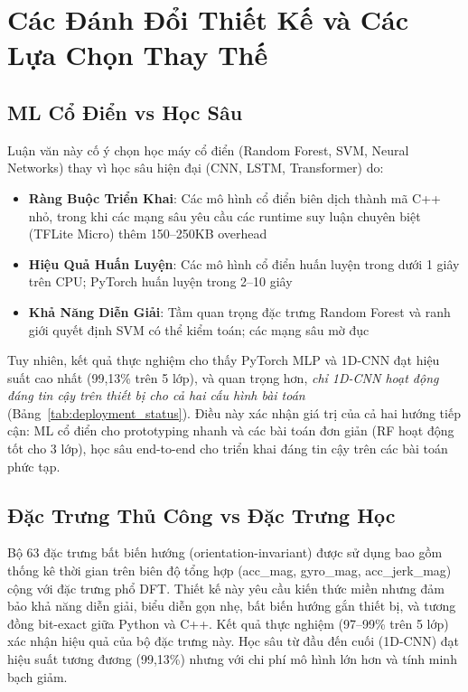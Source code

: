 \section{Các Đánh Đổi Thiết Kế và Các Lựa Chọn Thay Thế}

\subsection{ML Cổ Điển vs Học Sâu}
Luận văn này cố ý chọn học máy cổ điển (Random Forest, SVM, Neural Networks) thay vì học sâu hiện đại (CNN, LSTM, Transformer) do:
\begin{itemize}
    \item \textbf{Ràng Buộc Triển Khai}: Các mô hình cổ điển biên dịch thành mã C++ nhỏ, trong khi các mạng sâu yêu cầu các runtime suy luận chuyên biệt (TFLite Micro) thêm 150--250KB overhead
    \item \textbf{Hiệu Quả Huấn Luyện}: Các mô hình cổ điển huấn luyện trong dưới 1 giây trên CPU; PyTorch huấn luyện trong 2--10 giây
    \item \textbf{Khả Năng Diễn Giải}: Tầm quan trọng đặc trưng Random Forest và ranh giới quyết định SVM có thể kiểm toán; các mạng sâu mờ đục
\end{itemize}

Tuy nhiên, kết quả thực nghiệm cho thấy PyTorch MLP và 1D-CNN đạt hiệu suất cao nhất (99,13\% trên 5 lớp), và quan trọng hơn, \textit{chỉ 1D-CNN hoạt động đáng tin cậy trên thiết bị cho cả hai cấu hình bài toán} (Bảng~\ref{tab:deployment_status}). Điều này xác nhận giá trị của cả hai hướng tiếp cận: ML cổ điển cho prototyping nhanh và các bài toán đơn giản (RF hoạt động tốt cho 3 lớp), học sâu end-to-end cho triển khai đáng tin cậy trên các bài toán phức tạp.

\subsection{Đặc Trưng Thủ Công vs Đặc Trưng Học}
Bộ 63 đặc trưng bất biến hướng (orientation-invariant) được sử dụng bao gồm thống kê thời gian trên biên độ tổng hợp (acc\_mag, gyro\_mag, acc\_jerk\_mag) cộng với đặc trưng phổ DFT. Thiết kế này yêu cầu kiến thức miền nhưng đảm bảo khả năng diễn giải, biểu diễn gọn nhẹ, bất biến hướng gắn thiết bị, và tương đồng bit-exact giữa Python và C++. Kết quả thực nghiệm (97--99\% trên 5 lớp) xác nhận hiệu quả của bộ đặc trưng này. Học sâu từ đầu đến cuối (1D-CNN) đạt hiệu suất tương đương (99,13\%) nhưng với chi phí mô hình lớn hơn và tính minh bạch giảm.

